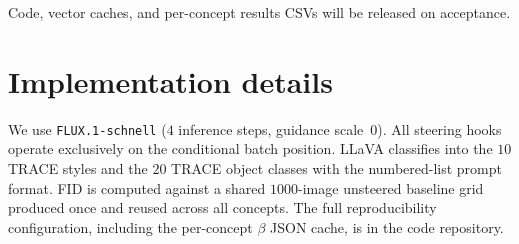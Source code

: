 \documentclass{article}
\begin{document}
Code, vector caches, and per-concept results CSVs will be released on
acceptance.




\appendix

\section{Implementation details}
\label{app:impl}

We use \texttt{FLUX.1-schnell} ($4$ inference steps, guidance
scale~$0$). All steering hooks operate exclusively on the
conditional batch position. LLaVA classifies into the $10$ TRACE
styles and the $20$ TRACE object classes with the numbered-list
prompt format. FID is computed against a shared $1000$-image
unsteered baseline grid produced once and reused across all
concepts. The full reproducibility configuration, including the
per-concept $\beta$ JSON cache, is in the code repository.
\end{document}
